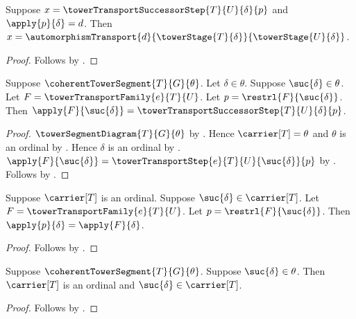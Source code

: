 \begin{proposition}\label{tower_transport_successor_step_value_bridge}
    Suppose $x=\towerTransportSuccessorStep{T}{U}{\delta}{p}$ and
        $\apply{p}{\delta}=d$.
    Then $x=\automorphismTransport{d}
        {\towerStage{T}{\delta}}{\towerStage{U}{\delta}}$.
\end{proposition}
\begin{proof}
    Follows by .
\end{proof}

\begin{proposition}\label{tower_transport_family_successor_step_equation}
    Suppose $\coherentTowerSegment{T}{G}{\theta}$.
    Let $\delta\in\theta$.
    Suppose $\suc{\delta}\in\theta$.
    Let $F=\towerTransportFamily{e}{T}{U}$.
    Let $p=\restrl{F}{\suc{\delta}}$.
    Then $\apply{F}{\suc{\delta}}=
        \towerTransportSuccessorStep{T}{U}{\delta}{p}$.
\end{proposition}
\begin{proof}
    $\towerSegmentDiagram{T}{G}{\theta}$ by
        .
    Hence $\carrier[T]=\theta$ and $\theta$ is an ordinal by
        .
    Hence $\delta$ is an ordinal by
        .
    $\apply{F}{\suc{\delta}}=
        \towerTransportStep{e}{T}{U}{\suc{\delta}}{p}$ by
        .
    Follows by .
\end{proof}

\begin{proposition}\label{tower_transport_family_successor_restriction_value}
    Suppose $\carrier[T]$ is an ordinal.
    Suppose $\suc{\delta}\in\carrier[T]$.
    Let $F=\towerTransportFamily{e}{T}{U}$.
    Let $p=\restrl{F}{\suc{\delta}}$.
    Then $\apply{p}{\delta}=\apply{F}{\delta}$.
\end{proposition}
\begin{proof}
    Follows by
        .
\end{proof}

\begin{proposition}\label{tower_transport_family_successor_carrier_context}
    Suppose $\coherentTowerSegment{T}{G}{\theta}$.
    Suppose $\suc{\delta}\in\theta$.
    Then $\carrier[T]$ is an ordinal and
        $\suc{\delta}\in\carrier[T]$.
\end{proposition}
\begin{proof}
    Follows by
        .
\end{proof}


